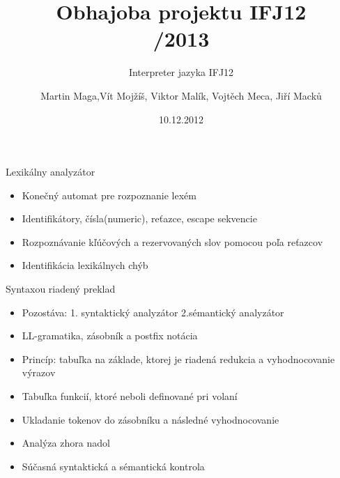 \documentclass[pdf,slideColor,fyma]{prosper}
\begin{document}
\title{Obhajoba projektu IFJ12 \\ /2013}
\subtitle{\medskip Interpreter jazyka IFJ12}
\author{Martin Maga,Vít Mojžíš, Viktor Malík, Vojtěch Meca, Jiří Macků}

\date{10.12.2012}
\maketitle


\begin{slide}{Lexikálny analyzátor}
\begin{itemize}
\item Konečný automat pre rozpoznanie lexém
\item Identifikátory, čísla(numeric), reťazce, escape sekvencie
\item Rozpoznávanie kľúčových a rezervovaných slov pomocou poľa reťazcov
\item Identifikácia lexikálnych chýb


\end{itemize}
\end{slide}

\begin{slide}{Syntaxou riadený preklad}

\begin{itemize}
\item Pozostáva: 1. syntaktický analyzátor 2.sémantický analyzátor
\item LL-gramatika, zásobník a postfix notácia
\item Princíp: tabuľka na základe, ktorej je riadená redukcia a vyhodnocovanie výrazov
\item Tabuľka funkcií, ktoré neboli definované pri volaní
\item Ukladanie tokenov do zásobníku a následné vyhodnocovanie
\item Analýza zhora nadol
\item Súčasná syntaktická a sémantická kontrola
\end{itemize}


\end{slide}
\end{document}
